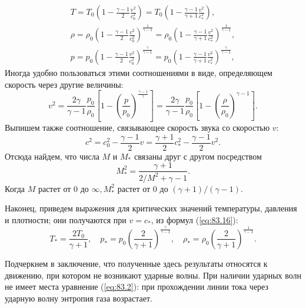 \begin{equation}
    \label{eq:83.16}
    \begin{array}{l}
    T = T_0 \left( 1 - \frac{\gamma - 1}{2} \frac{v^2}{c^2_0} \right) = 
    T_0 \left( 1 - \frac{\gamma - 1}{\gamma + 1} \frac{v^2}{c^2_*} \right),  \\
    \rho = \rho_0 \left( 1 - \frac{\gamma - 1}{2} \frac{v^2}{c^2_0} \right)^{\frac1{\gamma-1}} = 
    \rho_0 \left( 1 - \frac{\gamma - 1}{\gamma + 1} \frac{v^2}{c^2_*} \right)^{\frac1{\gamma-1}},  \\
    p = p_0 \left( 1 - \frac{\gamma - 1}{2} \frac{v^2}{c^2_0} \right)^{\frac{\gamma}{\gamma-1}} = 
    p_0 \left( 1 - \frac{\gamma - 1}{\gamma + 1} \frac{v^2}{c^2_*} \right)^{\frac{\gamma}{\gamma-1}}, 
    \end{array}
\end{equation}
Иногда удобно пользоваться этими соотношениями в виде, определяющем скорость через другие величины:
\begin{equation}
    \label{eq:83.17}
    v^2 = \frac{2\gamma}{\gamma - 1} \frac{p_0}{\rho_0}\left\lbrack 1 - \left(\frac{p}{p_0}\right)^{\frac{\gamma-1}{\gamma}}\right\rbrack =
    \frac{2\gamma}{\gamma-1} \frac{p_0}{\rho_0} \left\lbrack 1 - \left(\frac{\rho}{\rho_0}\right)^{\gamma-1} \right\rbrack.
\end{equation}
Выпишем также соотношение, связывающее скорость звука со скоростью $v$:
\begin{equation}
    \label{eq:83.18}
    c^2 = c^2_0 - \frac{\gamma-1}{2}v = \frac{\gamma+1}{2} c^2_* - \frac{\gamma-1}{2} v^2.
\end{equation}
Отсюда найдем, что числа $M$ и $M_*$ связаны друг с другом посредством
\begin{equation}
    \label{eq:83.19}
    M^2_* = \frac{\gamma+1}{2/M^2+\gamma-1}.
\end{equation}
Когда $M$ растет от 0 до $\infty, M^2_*$ растет от 0 до $(\gamma + 1)/(\gamma - 1)$.

Наконец, приведем выражения для критических значений температуры, давления и плотности; они получаются при
$v = c_*$, из формул (\ref{eq:83.16}):
\begin{equation}
    \label{eq:83.20}
    T_*=\frac{2T_0}{\gamma+1}, \quad
    p_* = p_0 \left( \frac{2}{\gamma+1} \right)^\frac{\gamma}{\gamma-1}, \quad
    \rho_* = \rho_0  \left( \frac{2}{\gamma+1} \right)^\frac{1}{\gamma-1}.
\end{equation}


Подчеркнем в заключение, что полученные здесь результаты относятся к движению, при котором не возникают ударные волны. При наличии ударных волн не имеет места уравнение (\ref{eq:83.2}): при прохождении линии тока через ударную волну энтропия газа возрастает.

